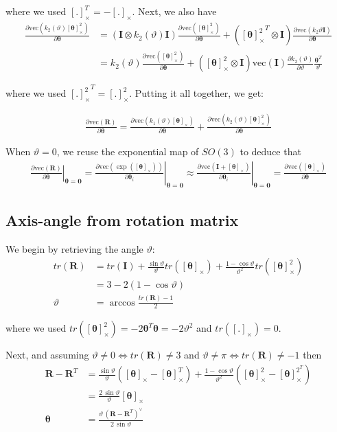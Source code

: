 \documentclass{article}
\renewcommand\aa{\bm{\theta}}
\renewcommand\t{\vartheta}
\newcommand\R{\bm{R}}
\newcommand\I{\bm{I}}
\renewcommand\skew[1]{[#1]_{\times}}
\newcommand\vecop[1]{\text{vec} \left( #1\right)}
\begin{document}
where we used $\skew{.}^T = - \skew{.}$. Next, we also have
\begin{align}
  \frac{\partial \vecop{k_2(\t) \skew{\aa}^2}}{\partial \aa}  
  &= \left( \I \otimes k_2(\t)\I \right) \frac{\partial \vecop{\skew{\aa}^2}}{\partial \aa}
    + \left({\skew{\aa}^2}^T \otimes \I \right) \frac{\partial \vecop{k_2{\t}\I}}{\partial \aa} \\
  &= k_2(\t) \frac{\partial \vecop{\skew{\aa}^2}}{\partial \aa}
    + \left({\skew{\aa}^2} \otimes \I \right) \vecop{\I} \frac{\partial k_2(\t)}{\partial \t} \frac{\aa^T}{\t}
\end{align}

where we used ${\skew{.}^2}^T = \skew{.}^2$. Putting it all together, we get:

\begin{align}
  \frac{\partial \vecop{\R}}{\partial \aa} = 
    \frac{\partial \vecop{k_1(\t) \skew{\aa}}}{\partial \aa}  
    + \frac{\partial \vecop{k_2(\t) \skew{\aa}^2}}{\partial \aa}  
\end{align}

When $\t = 0$, we reuse the exponential map of $SO(3)$ to deduce that 
\begin{align}
  \left. \frac{\partial \vecop{\R}}{\partial \aa} \right \vert_{\aa = \bm{0}} =
  \left. \frac{\partial \vecop{\exp(\skew{\aa})}}{\partial \aa_i} \right \vert_{\aa = \bm{0}} \approx
  \left. \frac{\partial \vecop{\I + \skew{\aa}}}{\partial \aa_i} \right \vert_{\aa = \bm{0}} =
  \frac{\partial \vecop{\skew{\aa}}}{\partial \aa}
\end{align}

\subsection{Axis-angle from rotation matrix}
We begin by retrieving the angle $\t$:
\begin{align}
  tr(\R) 
    &= tr(\I) + \frac{\sin \t }{\t} tr(\skew{\aa}) + \frac{1 - \cos \t}{\t^2} tr(\skew{\aa}^2) \\
    &= 3 - 2 (1 - \cos \t) \\
  \t &=  \arccos \frac{tr(\R) - 1}{2}
\end{align}

where we used $tr(\skew{\aa}^2) =  - 2 \aa^T \aa = -2\t^2$ and $tr(\skew{.}) = 0$.

Next, and assuming $\t \neq 0 \iff tr(\R) \neq 3$ and $\t \neq \pi \iff tr(\R) \neq -1$ then
\begin{align}
  \R - \R^T 
    &= \frac{\sin{\t}}{\t} \left(\skew{\aa} - \skew{\aa}^T\right)
    + \frac{1 - \cos \t}{\t^2} \left( \skew{\aa}^2 - \skew{\aa}^{2^T} \right) \\
    &= \frac{2\, \sin \t}{\t} \skew{\aa} \\
  \aa &= \frac{\t \, \left(\R - \R^T \right)^\vee }{2\, \sin \t}
\end{align}
\end{document}
